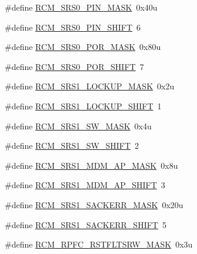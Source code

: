 \begin{DoxyCompactItemize}
\#define \hyperlink{group___r_c_m___register___masks_gab94707d2e91618c8c803dfa2d8df4e7b}{R\+C\+M\+\_\+\+S\+R\+S0\+\_\+\+P\+I\+N\+\_\+\+M\+A\+SK}~0x40u
\item 
\#define \hyperlink{group___r_c_m___register___masks_ga1c1ae6946300c9f33bf5575d45d2b862}{R\+C\+M\+\_\+\+S\+R\+S0\+\_\+\+P\+I\+N\+\_\+\+S\+H\+I\+FT}~6
\item 
\#define \hyperlink{group___r_c_m___register___masks_gad172e7645b5b6a0c5a2ff91db3087f7e}{R\+C\+M\+\_\+\+S\+R\+S0\+\_\+\+P\+O\+R\+\_\+\+M\+A\+SK}~0x80u
\item 
\#define \hyperlink{group___r_c_m___register___masks_ga98b995f8d56d338b315d6750072474ff}{R\+C\+M\+\_\+\+S\+R\+S0\+\_\+\+P\+O\+R\+\_\+\+S\+H\+I\+FT}~7
\item 
\#define \hyperlink{group___r_c_m___register___masks_ga4f7c4ce64c13c55fc0c7aaea3a702a03}{R\+C\+M\+\_\+\+S\+R\+S1\+\_\+\+L\+O\+C\+K\+U\+P\+\_\+\+M\+A\+SK}~0x2u
\item 
\#define \hyperlink{group___r_c_m___register___masks_ga71f857503a2b2d2e0c30d4762e89a8d8}{R\+C\+M\+\_\+\+S\+R\+S1\+\_\+\+L\+O\+C\+K\+U\+P\+\_\+\+S\+H\+I\+FT}~1
\item 
\#define \hyperlink{group___r_c_m___register___masks_ga72f541acd2a0992ad0d1d089c694ad5f}{R\+C\+M\+\_\+\+S\+R\+S1\+\_\+\+S\+W\+\_\+\+M\+A\+SK}~0x4u
\item 
\#define \hyperlink{group___r_c_m___register___masks_ga7e554c1ae96dae684fbc81204283f86c}{R\+C\+M\+\_\+\+S\+R\+S1\+\_\+\+S\+W\+\_\+\+S\+H\+I\+FT}~2
\item 
\#define \hyperlink{group___r_c_m___register___masks_ga6af4d8ed2135b602de575373f22b1af8}{R\+C\+M\+\_\+\+S\+R\+S1\+\_\+\+M\+D\+M\+\_\+\+A\+P\+\_\+\+M\+A\+SK}~0x8u
\item 
\#define \hyperlink{group___r_c_m___register___masks_ga91611da7546b27a939e92926f378229f}{R\+C\+M\+\_\+\+S\+R\+S1\+\_\+\+M\+D\+M\+\_\+\+A\+P\+\_\+\+S\+H\+I\+FT}~3
\item 
\#define \hyperlink{group___r_c_m___register___masks_gaa09459c8ed6200a5828221f9d15656d3}{R\+C\+M\+\_\+\+S\+R\+S1\+\_\+\+S\+A\+C\+K\+E\+R\+R\+\_\+\+M\+A\+SK}~0x20u
\item 
\#define \hyperlink{group___r_c_m___register___masks_gab30a0b3f954edb8a480649686bd208fb}{R\+C\+M\+\_\+\+S\+R\+S1\+\_\+\+S\+A\+C\+K\+E\+R\+R\+\_\+\+S\+H\+I\+FT}~5
\item 
\#define \hyperlink{group___r_c_m___register___masks_ga36e0fc448dc94b90314dd6dd2dd41763}{R\+C\+M\+\_\+\+R\+P\+F\+C\+\_\+\+R\+S\+T\+F\+L\+T\+S\+R\+W\+\_\+\+M\+A\+SK}~0x3u
\item 

\end{DoxyCompactItemize}
